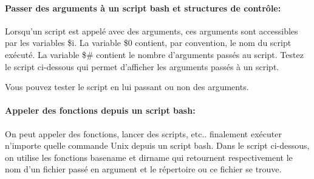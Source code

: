 \paragraph{Passer des arguments à un script bash et structures de contrôle:}

Lorsqu'un script \bashcmd est appelé avec des arguments, ces arguments sont accessibles par les variables \$i. La variable \$0 contient, par convention, le nom du script exécuté. La variable \$\# contient le nombre d'arguments passés au script. Testez le script ci-dessous qui permet d'afficher les arguments passés à un script.

 \cprotect{}

Vous pouvez tester le script en lui passant ou non des arguments.


\paragraph{Appeler des fonctions depuis un script bash:}

On peut appeler des fonctions, lancer des scripts, etc.. finalement exécuter n'importe quelle commande Unix depuis un script bash. Dans le script ci-dessous, on utilise les fonctions basename et dirname qui retournent respectivement le nom d'un fichier passé en argument et le répertoire ou ce fichier se trouve.

\cprotect{}


